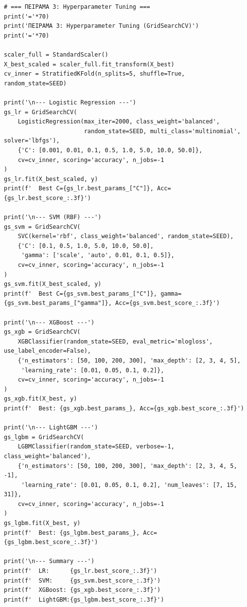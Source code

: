 \begin{lstlisting}
# === ΠΕΙΡΑΜΑ 3: Hyperparameter Tuning ===
print('='*70)
print('ΠΕΙΡΑΜΑ 3: Hyperparameter Tuning (GridSearchCV)')
print('='*70)
 
scaler_full = StandardScaler()
X_best_scaled = scaler_full.fit_transform(X_best)
cv_inner = StratifiedKFold(n_splits=5, shuffle=True, random_state=SEED)
 
print('\n--- Logistic Regression ---')
gs_lr = GridSearchCV(
    LogisticRegression(max_iter=2000, class_weight='balanced',
                       random_state=SEED, multi_class='multinomial', solver='lbfgs'),
    {'C': [0.001, 0.01, 0.1, 0.5, 1.0, 5.0, 10.0, 50.0]},
    cv=cv_inner, scoring='accuracy', n_jobs=-1
)
gs_lr.fit(X_best_scaled, y)
print(f'  Best C={gs_lr.best_params_["C"]}, Acc={gs_lr.best_score_:.3f}')
 
print('\n--- SVM (RBF) ---')
gs_svm = GridSearchCV(
    SVC(kernel='rbf', class_weight='balanced', random_state=SEED),
    {'C': [0.1, 0.5, 1.0, 5.0, 10.0, 50.0],
     'gamma': ['scale', 'auto', 0.01, 0.1, 0.5]},
    cv=cv_inner, scoring='accuracy', n_jobs=-1
)
gs_svm.fit(X_best_scaled, y)
print(f'  Best C={gs_svm.best_params_["C"]}, gamma={gs_svm.best_params_["gamma"]}, Acc={gs_svm.best_score_:.3f}')
 
print('\n--- XGBoost ---')
gs_xgb = GridSearchCV(
    XGBClassifier(random_state=SEED, eval_metric='mlogloss', use_label_encoder=False),
    {'n_estimators': [50, 100, 200, 300], 'max_depth': [2, 3, 4, 5],
     'learning_rate': [0.01, 0.05, 0.1, 0.2]},
    cv=cv_inner, scoring='accuracy', n_jobs=-1
)
gs_xgb.fit(X_best, y)
print(f'  Best: {gs_xgb.best_params_}, Acc={gs_xgb.best_score_:.3f}')
 
print('\n--- LightGBM ---')
gs_lgbm = GridSearchCV(
    LGBMClassifier(random_state=SEED, verbose=-1, class_weight='balanced'),
    {'n_estimators': [50, 100, 200, 300], 'max_depth': [2, 3, 4, 5, -1],
     'learning_rate': [0.01, 0.05, 0.1, 0.2], 'num_leaves': [7, 15, 31]},
    cv=cv_inner, scoring='accuracy', n_jobs=-1
)
gs_lgbm.fit(X_best, y)
print(f'  Best: {gs_lgbm.best_params_}, Acc={gs_lgbm.best_score_:.3f}')
 
print('\n--- Summary ---')
print(f'  LR:      {gs_lr.best_score_:.3f}')
print(f'  SVM:     {gs_svm.best_score_:.3f}')
print(f'  XGBoost: {gs_xgb.best_score_:.3f}')
print(f'  LightGBM:{gs_lgbm.best_score_:.3f}')
\end{lstlisting}
 
